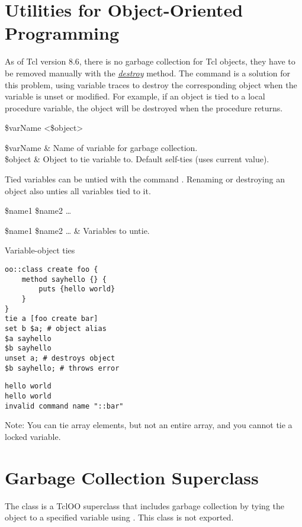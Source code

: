 \section{Utilities for Object-Oriented Programming}
As of Tcl version 8.6, there is no garbage collection for Tcl objects, they have to be removed manually with the \textit{\href{https://www.tcl.tk/man/tcl8.6/TclCmd/object.html}{destroy}} method. 
The command  is a solution for this problem, using variable traces to destroy the corresponding object when the variable is unset or modified. 
For example, if an object is tied to a local procedure variable, the object will be destroyed when the procedure returns.

\begin{syntax}
 \$varName <\$object>
\end{syntax}
\begin{args}
\$varName & Name of variable for garbage collection. \\
\$object & Object to tie variable to. Default self-ties (uses current value).
\end{args}

Tied variables can be untied with the command . 
Renaming or destroying an object also unties all variables tied to it. 
\begin{syntax}
 \$name1 \$name2 …
\end{syntax}
\begin{args}
\$name1 \$name2 … & Variables to untie.
\end{args}

\begin{example}{Variable-object ties}
\begin{lstlisting}
oo::class create foo {
    method sayhello {} {
        puts {hello world}
    }
}
tie a [foo create bar]
set b $a; # object alias
$a sayhello
$b sayhello
unset a; # destroys object
$b sayhello; # throws error
\end{lstlisting}
\tcblower
\begin{lstlisting}
hello world
hello world
invalid command name "::bar"
\end{lstlisting}
\end{example}
Note: You can tie array elements, but not an entire array, and you cannot tie a locked variable.

\clearpage
\section{Garbage Collection Superclass}
The class  is a TclOO superclass that includes garbage collection by tying the object to a specified variable using .
This class is not exported.

